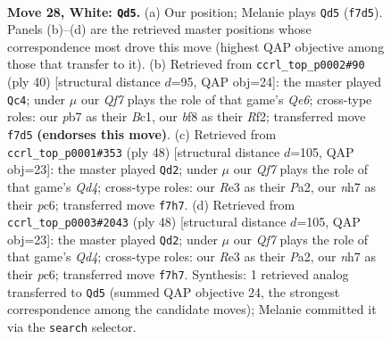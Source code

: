 \documentclass[11pt]{article}
\begin{document}
\clearpage

\begin{figure}[p]\centering
\begin{subfigure}{0.46\textwidth}\centering
\resizebox{\linewidth}{!}{%
\newchessgame
\chessboard[
  setfen={1k3b1r/1p2pQ1n/1r1p4/1b4p1/3PP3/1P2RP2/6PP/1K5R w - - 0 28},
  showmover=false,
  pgfstyle=straightmove, color=movearrow, markmove={f7-d5}
]}
\caption{}
\end{subfigure}\hfill
\begin{subfigure}{0.46\textwidth}\centering
\resizebox{\linewidth}{!}{%
\newchessgame
\chessboard[
  setfen={1k1r1b2/pp6/4Q1p1/2p1Pn2/8/1PPp1Pq1/P2P1R2/R1B2K2 w - - 4 21},
  showmover=false,
  pgfstyle=straightmove, color=movearrow, markmove={e6-c4}
]}
\caption{}
\end{subfigure}
\\[4pt]
\begin{subfigure}{0.46\textwidth}\centering
\resizebox{\linewidth}{!}{%
\newchessgame
\chessboard[
  setfen={r3r1k1/pp3p2/2p3p1/2Pb4/3Q2P1/8/PP3P2/R5K1 w - - 1 25},
  showmover=false,
  pgfstyle=straightmove, color=movearrow, markmove={d4-d2}
]}
\caption{}
\end{subfigure}\hfill
\begin{subfigure}{0.46\textwidth}\centering
\resizebox{\linewidth}{!}{%
\newchessgame
\chessboard[
  setfen={r3r1k1/pp3p2/2p3p1/2Pb4/3Q2P1/8/PP3P2/R5K1 w - - 1 25},
  showmover=false,
  pgfstyle=straightmove, color=movearrow, markmove={d4-d2}
]}
\caption{}
\end{subfigure}
\caption{\textbf{Move 28, White: \texttt{Qd5}.} (a) Our position; Melanie plays \texttt{Qd5} (\texttt{f7d5}). Panels (b)--(d) are the retrieved master positions whose correspondence most drove this move (highest QAP objective among those that transfer to it). (b) Retrieved from \texttt{ccrl\_top\_p0002\#90} (ply 40) [structural distance $d$=95, QAP obj=24]: the master played \texttt{Qc4}; under $\mu$ our \emph{Qf7} plays the role of that game's \emph{Qe6}; cross-type roles: our \emph{p}b7 as their \emph{B}c1, our \emph{b}f8 as their \emph{R}f2; transferred move \texttt{f7d5} \textbf{(endorses this move)}. (c) Retrieved from \texttt{ccrl\_top\_p0001\#353} (ply 48) [structural distance $d$=105, QAP obj=23]: the master played \texttt{Qd2}; under $\mu$ our \emph{Qf7} plays the role of that game's \emph{Qd4}; cross-type roles: our \emph{R}e3 as their \emph{P}a2, our \emph{n}h7 as their \emph{p}c6; transferred move \texttt{f7h7}. (d) Retrieved from \texttt{ccrl\_top\_p0003\#2043} (ply 48) [structural distance $d$=105, QAP obj=23]: the master played \texttt{Qd2}; under $\mu$ our \emph{Qf7} plays the role of that game's \emph{Qd4}; cross-type roles: our \emph{R}e3 as their \emph{P}a2, our \emph{n}h7 as their \emph{p}c6; transferred move \texttt{f7h7}. Synthesis: 1 retrieved analog transferred to \texttt{Qd5} (summed QAP objective 24, the strongest correspondence among the candidate moves); Melanie committed it via the \texttt{search} selector.}
\label{fig:thought-m54}
\end{figure}
\end{document}
